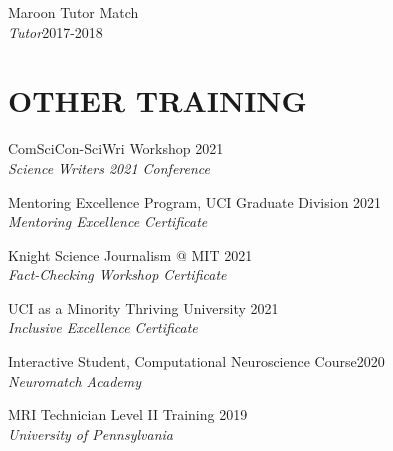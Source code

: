 \documentclass[margin, 10pt]{res} %
\begin{document}
\begin{resume}
{Maroon Tutor Match} \\
{\sl Tutor}\hfill{2017-2018}




\section{OTHER TRAINING} 
ComSciCon-SciWri Workshop \hfill 2021 \\
{\sl  Science Writers 2021 Conference}

Mentoring Excellence Program, UCI Graduate Division \hfill 2021 \\
{\sl  Mentoring Excellence Certificate}

Knight Science Journalism @ MIT \hfill 2021 \\
{\sl  Fact-Checking Workshop Certificate}

UCI as a Minority Thriving University \hfill 2021 \\
{\sl Inclusive Excellence Certificate}

Interactive Student, Computational Neuroscience Course\hfill 2020 \\
{\sl Neuromatch Academy}

MRI Technician Level II Training \hfill 2019 \\
{\sl University of Pennsylvania}


\end{resume}
\end{document}

